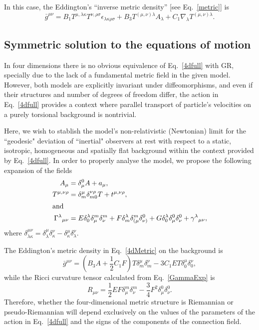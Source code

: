 \documentclass{ws-mpla}
\renewcommand{\(}{\left(}
\renewcommand{\)}{\right)}
\renewcommand{\[}{\left[}
\renewcommand{\]}{\right]}
\begin{document}
In this case, the Eddington's  ``inverse metric density'' [see Eq.~\eqref{metric}] is 
\begin{dmath}
  \label{4dMetric}
  \bar{g}^{\mu\nu} = B_1 T^{\mu,\lambda\kappa}T^{\nu,\rho\sigma}\epsilon_{\lambda\kappa\rho\sigma} + B_3 T^{(\mu,\nu)\lambda}A_\lambda + C_1 {\nabla}_\lambda T^{(\mu,\nu)\lambda}.
\end{dmath}


\subsection*{Symmetric solution to the equations of motion}

In four dimensions there is no obvious equivalence of Eq.~\eqref{4dfull} with GR, specially due to the lack of a fundamental metric field in the given model. However, both models are explicitly invariant under diffeomorphisms, and even if their structures and number of degrees of freedom differ, the action in Eq.~\eqref{4dfull} provides a context where parallel transport of particle's velocities on a purely torsional background is nontrivial.

Here, we wish to stablish the model's non-relativistic (Newtonian) limit for the ``geodesic" deviation of ``inertial" observers at rest with respect to a static, isotropic, homogeneous and spatially flat background within the context provided by Eq.~\eqref{4dfull}. In order to properly analyse the model, we  propose the following expansion of the fields
\begin{align}
  A_\mu &= \delta_\mu^0 A + a_\mu,\\
  T^{\mu,\nu\rho} &= \delta^{\mu}_m\delta^{\nu\rho}_{m0}T + t^{\mu,\nu\rho},\\
  \shortintertext{and}
  \Gamma^\lambda{}_{\mu\nu} &= E \delta^\lambda_0 \delta^m_\mu \delta^m_\nu + F \delta^\lambda_m \delta^m_{(\mu}\delta^0_{\nu)} + G\delta^\lambda_0 \delta^0_{\mu}\delta^0_{\nu} + \gamma^\lambda{}_{\mu\nu},
  \label{GammaExp}
\end{align}
where $\delta^{\mu\nu}_{\lambda\kappa}=\delta^{\mu}_{\lambda}\delta^{\nu}_{\kappa}-\delta^{\mu}_{\kappa}\delta^{\nu}_{\lambda}$.



The Eddington's metric density in Eq.~\eqref{4dMetric}  on the background is
\begin{dmath}
  \label{3+1metric}
  \bar{g}^{\mu\nu} = \left(B_3 A + \frac{1}{2}C_1 F\right) T \delta^\mu_m \delta^\nu_m - 3 C_1 E T \delta^\mu_0\delta^\nu_0,
\end{dmath}
while the Ricci curvature tensor calculated from Eq.~\eqref{GammaExp} is
\begin{dmath}
  R_{\mu\nu} = \frac{1}{2} E F \delta^m_\mu \delta^m_\nu - \frac{3}{4} F^2 \delta^0_\mu \delta^0_\nu.
\end{dmath}
Therefore, whether the four-dimensional metric structure is Riemannian or pseudo-Riemannian will depend exclusively on the values of the parameters of the action in Eq.~\eqref{4dfull} and the signs of the components of the connection field. 
\end{document}
